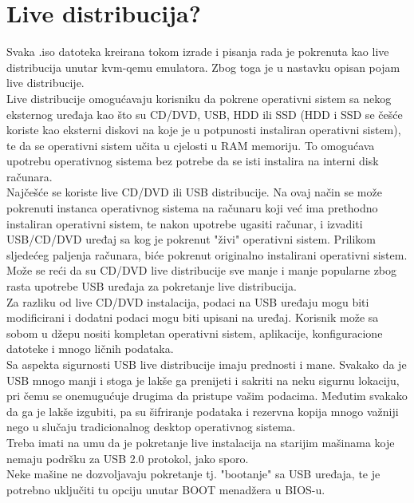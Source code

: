 \documentclass[12pt,vi]{mitthesis}
\begin{document}
\section*{Live distribucija?}
\indent
Svaka .iso datoteka kreirana tokom izrade i pisanja rada je pokrenuta kao live distribucija unutar kvm-qemu emulatora. Zbog toga je u nastavku opisan pojam live distribucije.\\
\indent
Live distribucije\cite{wiki-livecd} omogućavaju korisniku da pokrene operativni sistem sa nekog eksternog uređaja kao što su CD/DVD, USB, HDD ili SSD (HDD i SSD se češće koriste kao eksterni diskovi na koje je u potpunosti instaliran operativni sistem), te da se operativni sistem učita u cjelosti u RAM memoriju. To omogućava upotrebu operativnog sistema bez potrebe da se isti instalira na interni disk računara.\\
\indent
Najčešće se koriste live CD/DVD ili USB distribucije.
Na ovaj način se može pokrenuti instanca operativnog sistema na računaru koji već ima prethodno instaliran operativni sistem, te nakon upotrebe ugasiti računar, i izvaditi USB/CD/DVD uređaj sa kog je pokrenut "živi" operativni sistem. Prilikom sljedećeg paljenja računara, biće pokrenut originalno instalirani operativni sistem.\\
Može se reći da su CD/DVD live distribucije sve manje i manje popularne zbog rasta upotrebe USB uređaja za pokretanje live distribucija.\\
\indent
Za razliku od live CD/DVD instalacija, podaci na USB uređaju mogu biti modificirani i dodatni podaci mogu biti upisani na uređaj. Korisnik može sa sobom u džepu nositi kompletan operativni sistem, aplikacije, konfiguracione datoteke i mnogo ličnih podataka.\\
\indent
Sa aspekta sigurnosti USB live distribucije imaju prednosti i mane. Svakako da je USB mnogo manji i stoga je lakše ga prenijeti i sakriti na neku sigurnu lokaciju, pri čemu se onemugućuje drugima da pristupe vašim podacima. Međutim svakako da ga je lakše izgubiti, pa su šifriranje podataka i rezervna kopija mnogo važniji nego u slučaju tradicionalnog desktop operativnog sistema.\\
\indent
Treba imati na umu da je pokretanje live instalacija na starijim mašinama koje nemaju podršku za USB 2.0 protokol, jako sporo.\\
Neke mašine ne dozvoljavaju pokretanje tj. "bootanje" sa USB uređaja, te je potrebno uključiti tu opciju unutar BOOT menadžera u BIOS-u.
\end{document}
